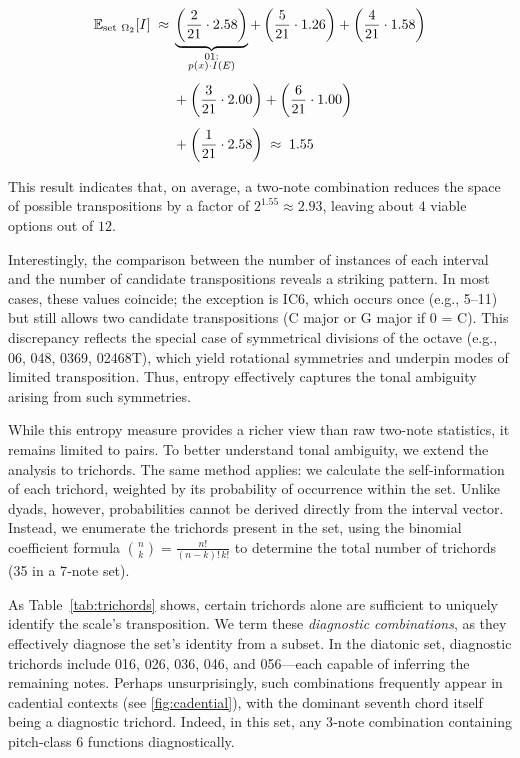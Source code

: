 \documentclass[10pt,twocolumn]{article}
\numberwithin{equation}{section} %
\begin{document}
    \begin{align}
        \mathbb{E}_{\text{set}~\Omega_{2}}[I] \;\approx\; &
        \underbrace{\left( \frac{2}{21} \cdot 2.58 \right)}_{\substack{\text{01:}\\ p(x)\cdot I(E)}} +
        \left( \frac{5}{21} \cdot 1.26 \right) +
        \left( \frac{4}{21} \cdot 1.58 \right)
        \notag \\[4pt]
        &+ \left( \frac{3}{21} \cdot 2.00 \right) +
        \left( \frac{6}{21} \cdot 1.00 \right)
        \notag \\[4pt]
        &+ \left( \frac{1}{21} \cdot 2.58 \right)
        \;\approx\; 1.55
        \label{eq:expectation-example}
    \end{align}

    This result indicates that, on average, a two‑note combination reduces the space of possible transpositions by a factor of $2^{1.55} \approx 2.93$, leaving about $4$ viable options out of $12$.

    Interestingly, the comparison between the number of instances of each interval and the number of candidate transpositions reveals a striking pattern.
    In most cases, these values coincide; the exception is IC6, which occurs once (e.g., 5–11) but still allows two candidate transpositions (C major or G\text{$\flat$} major if 0 = C).
    This discrepancy reflects the special case of symmetrical divisions of the octave (e.g., 06, 048, 0369, 02468T), which yield rotational symmetries and underpin modes of limited transposition.
    Thus, entropy effectively captures the tonal ambiguity arising from such symmetries.

    While this entropy measure provides a richer view than raw two-note statistics, it remains limited to pairs.
    To better understand tonal ambiguity, we extend the analysis to trichords.
    The same method applies: we calculate the self-information of each trichord, weighted by its probability of occurrence within the set.
    Unlike dyads, however, probabilities cannot be derived directly from the interval vector.
    Instead, we enumerate the trichords present in the set, using the binomial coefficient formula $\binom{n}{k} = \frac{n!}{(n-k)! \, k!}$ to determine the total number of trichords (35 in a 7‑note set).

    

    As Table~\ref{tab:trichords} shows, certain trichords alone are sufficient to uniquely identify the scale's transposition.
    We term these \textit{diagnostic combinations}, as they effectively diagnose the set's identity from a subset.
    In the diatonic set, diagnostic trichords include 016, 026, 036, 046, and 056—each capable of inferring the remaining notes.
    Perhaps unsurprisingly, such combinations frequently appear in cadential contexts (see \autoref{fig:cadential}), with the dominant seventh chord itself being a diagnostic trichord.
    Indeed, in this set, any 3‑note combination containing pitch‑class 6 functions diagnostically.
\end{document}
